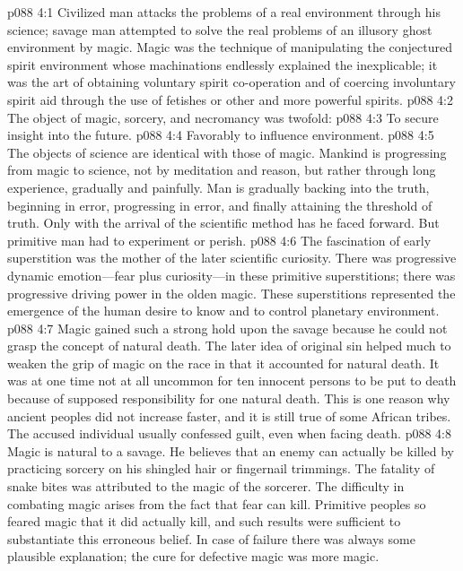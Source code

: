 \vs p088 4:1 Civilized man attacks the problems of a real environment through his science; savage man attempted to solve the real problems of an illusory ghost environment by magic. Magic was the technique of manipulating the conjectured spirit environment whose machinations endlessly explained the inexplicable; it was the art of obtaining voluntary spirit co\hyp{}operation and of coercing involuntary spirit aid through the use of fetishes or other and more powerful spirits.
\vs p088 4:2 The object of magic, sorcery, and necromancy was twofold:
\pc \vs p088 4:3 \bibnobreakspace To secure insight into the future.
\vs p088 4:4 \bibnobreakspace Favorably to influence environment.
\pc \vs p088 4:5 The objects of science are identical with those of magic. Mankind is progressing from magic to science, not by meditation and reason, but rather through long experience, gradually and painfully. Man is gradually backing into the truth, beginning in error, progressing in error, and finally attaining the threshold of truth. Only with the arrival of the scientific method has he faced forward. But primitive man had to experiment or perish.
\vs p088 4:6 The fascination of early superstition was the mother of the later scientific curiosity. There was progressive dynamic emotion---fear plus curiosity---in these primitive superstitions; there was progressive driving power in the olden magic. These superstitions represented the emergence of the human desire to know and to control planetary environment.
\vs p088 4:7 Magic gained such a strong hold upon the savage because he could not grasp the concept of natural death. The later idea of original sin helped much to weaken the grip of magic on the race in that it accounted for natural death. It was at one time not at all uncommon for ten innocent persons to be put to death because of supposed responsibility for one natural death. This is one reason why ancient peoples did not increase faster, and it is still true of some African tribes. The accused individual usually confessed guilt, even when facing death.
\vs p088 4:8 Magic is natural to a savage. He believes that an enemy can actually be killed by practicing sorcery on his shingled hair or fingernail trimmings. The fatality of snake bites was attributed to the magic of the sorcerer. The difficulty in combating magic arises from the fact that fear can kill. Primitive peoples so feared magic that it did actually kill, and such results were sufficient to substantiate this erroneous belief. In case of failure there was always some plausible explanation; the cure for defective magic was more magic.\plusone
